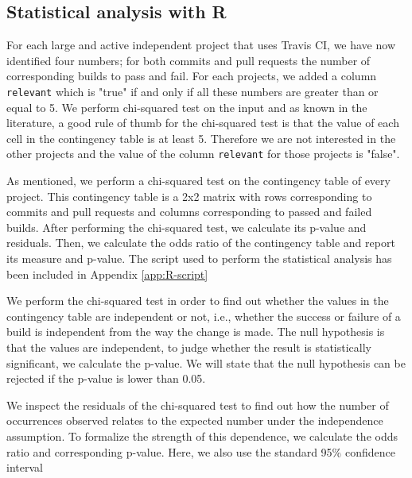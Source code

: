 \subsection{Statistical analysis with R}
For each large and active independent project that uses Travis CI, we have now identified four numbers; for both commits and pull requests the number of corresponding builds to pass and fail.
For each projects, we added a column \texttt{relevant} which is "true" if and only if all these numbers are greater than or equal to 5.
We perform chi-squared test on the input and as known in the literature, a good rule of thumb for the chi-squared test is that the value of each cell in the contingency table is at least 5.
Therefore we are not interested in the other projects and the value of the column \texttt{relevant} for those projects is "false".

As mentioned, we perform a chi-squared test on the contingency table of every project.
This contingency table is a 2x2 matrix with rows corresponding to commits and pull requests and columns corresponding to passed and failed builds.
After performing the chi-squared test, we calculate its p-value and residuals.
Then, we calculate the odds ratio of the contingency table and report its measure and p-value. 
The script used to perform the statistical analysis has been included in Appendix \ref{app:R-script}

We perform the chi-squared test in order to find out whether the values in the contingency table are independent or not, i.e., whether the success or failure of a build is independent from the way the change is made.
The null hypothesis is that the values are independent, to judge whether the result is statistically significant, we calculate the p-value.
We will state that the null hypothesis can be rejected if the p-value is lower than 0.05.

We inspect the residuals of the chi-squared test to find out how the number of occurrences %
observed relates to the expected number under the independence assumption.
To formalize the strength of this dependence, we calculate the odds ratio and corresponding p-value. 
Here, we also use the standard 95\% confidence interval

